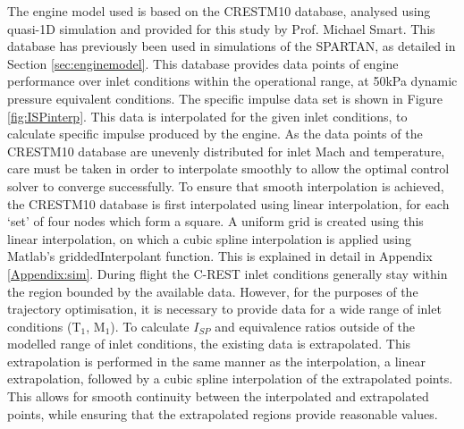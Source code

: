  The engine model used is based on the \textsf{CRESTM10} database\cite{Preller2017b,Preller2018a}, analysed using quasi-1D simulation and provided for this study by Prof. Michael Smart. This database has previously been used in simulations of the SPARTAN, as detailed in Section \ref{sec:enginemodel}.
This database provides data points of engine performance over inlet conditions within the operational range, at 50kPa dynamic pressure equivalent conditions. The specific impulse data set is shown in Figure \ref{fig:ISPinterp}. This data is interpolated for the given inlet conditions, to calculate specific impulse produced by the engine. As the data points of the \textsf{CRESTM10} database are unevenly distributed for inlet Mach and temperature, care must be taken in order to interpolate smoothly to allow the optimal control solver to converge successfully. To ensure that smooth interpolation is achieved, the \textsf{CRESTM10} database is first interpolated using linear interpolation, for each `set' of four nodes which form a square. A uniform grid is created using this linear interpolation, on which a cubic spline interpolation is applied using Matlab's \textsf{griddedInterpolant} function. This is explained in detail in Appendix \ref{Appendix:sim}. During flight the C-REST inlet conditions generally stay within the region bounded by the available data. However, for the purposes of the trajectory optimisation, it is necessary to provide data for a wide range of inlet conditions (T$_1$, M$_1$). To calculate $I_{SP}$ and equivalence ratios outside of the modelled range of inlet conditions, the existing data is extrapolated. This extrapolation is performed in the same manner as the interpolation, a linear extrapolation, followed by a cubic spline interpolation of the extrapolated points. This allows for smooth continuity between the interpolated and extrapolated points, while ensuring that the extrapolated regions provide reasonable values. 

